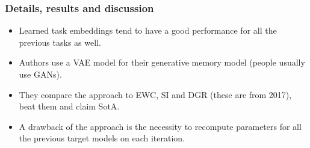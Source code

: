 \documentclass[10pt]{beamer}
\begin{document}
\begin{frame}
    \frametitle{Details, results and discussion}
    \begin{itemize}
        \item\pause Learned task embeddings tend to have a good performance for all the previous tasks as well.
        \item\pause Authors use a VAE model for their generative memory model (people usually use GANs).
        \item\pause They compare the approach to EWC, SI and DGR (these are from 2017), beat them and claim SotA.
        \item\pause A drawback of the approach is the necessity to recompute parameters for all the previous target models on each iteration.
    \end{itemize}
\end{frame}
\end{document}
